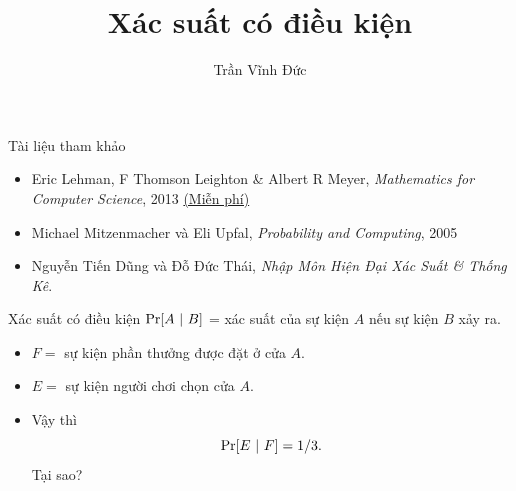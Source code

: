 %


\title{Xác suất có điều kiện} 
 \author{Trần Vĩnh Đức}
      
\maketitle

\begin{frame}{Tài liệu tham khảo}
  \begin{itemize}
  \item Eric Lehman, F Thomson Leighton \& Albert R Meyer,
    \textit{Mathematics for Computer Science}, 2013
    \href{https://www.seas.harvard.edu/courses/cs20/MIT6_042Notes.pdf}{\color{blue}(Miễn
    phí)}
  \item Michael Mitzenmacher và Eli Upfal, \textit{Probability and Computing}, 2005
  \item  Nguyễn Tiến Dũng và Đỗ Đức Thái, \textit{Nhập Môn Hiện Đại Xác Suất \& Thống Kê}.
  \end{itemize}
\end{frame}

\begin{frame}
  \begin{block}{Xác suất có điều kiện}
    $\pr[A\ |\  B]$ = xác suất của sự kiện $A$ nếu  sự kiện $B$ xảy ra.
  \end{block}
\begin{xmpl}
  \begin{itemize}
  \item $F =$ sự kiện phần thưởng được đặt ở cửa $A$.
  \item $E  =$ sự kiện người chơi chọn cửa $A$.
  \item Vậy thì 
    $$
    \mathrm{Pr} [E \ | \ F] = 1/3. 
    $$
Tại sao?
  \end{itemize}
\end{xmpl}
\end{frame}

